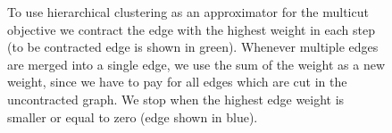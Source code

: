 \begin{center}
\begin{figure}
\begin{center}
{\begin{tikzpicture}
    \end{tikzpicture}


}
\caption{
     To use hierarchical clustering as an approximator for
    the multicut objective we contract the edge with the highest weight
    in each step (to be contracted edge is shown in green).
    Whenever multiple edges are merged into a single edge,
    we use the sum of the weight as a new weight, since
    we have to pay for all edges which are cut in the uncontracted
    graph.
    We stop when the highest edge weight is smaller
    or equal to zero (edge shown in blue).
}\label{fig:hc_alg}
\end{center}
\end{figure}
\end{center}



